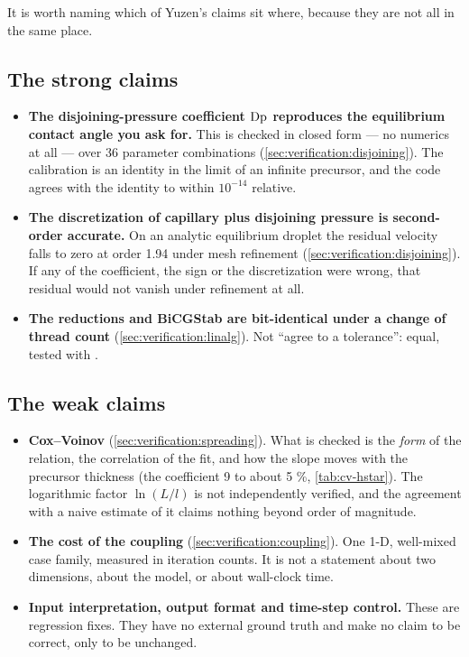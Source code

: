 It is worth naming which of Yuzen's claims sit where, because they are not all
in the same place.

\subsection*{The strong claims}

\begin{itemize}
  \item \textbf{The disjoining-pressure coefficient $\mathrm{Dp}$ reproduces the
    equilibrium contact angle you ask for.} This is checked in closed form ---
    no numerics at all --- over 36 parameter combinations
    (\cref{sec:verification:disjoining}). The calibration is an identity in the
    limit of an infinite precursor, and the code agrees with the identity to
    within $10^{-14}$ relative.
  \item \textbf{The discretization of capillary plus disjoining pressure is
    second-order accurate.} On an analytic equilibrium droplet the residual
    velocity falls to zero at order 1.94 under mesh refinement
    (\cref{sec:verification:disjoining}). If any of the coefficient, the sign
    or the discretization were wrong, that residual would not vanish under
    refinement at all.
  \item \textbf{The reductions and BiCGStab are bit-identical under a change of
    thread count} (\cref{sec:verification:linalg}). Not ``agree to a tolerance'':
    equal, tested with \code{==}.
\end{itemize}

\subsection*{The weak claims}

\begin{itemize}
  \item \textbf{Cox--Voinov} (\cref{sec:verification:spreading}). What is
    checked is the \emph{form} of the relation, the correlation of the fit,
    and how the slope moves with the precursor thickness (the coefficient 9
    to about 5 \%, \cref{tab:cv-hstar}).
    The logarithmic factor $\ln(L/l)$ is not independently verified, and the
    agreement with a naive estimate of it claims nothing beyond order of
    magnitude.
  \item \textbf{The cost of the coupling} (\cref{sec:verification:coupling}).
    One 1-D, well-mixed case family, measured in iteration counts. It is not a
    statement about two dimensions, about the  model, or about
    wall-clock time.
  \item \textbf{Input interpretation, output format and time-step control.}
    These are regression fixes. They have no external ground truth and make no
    claim to be correct, only to be unchanged.
\end{itemize}

